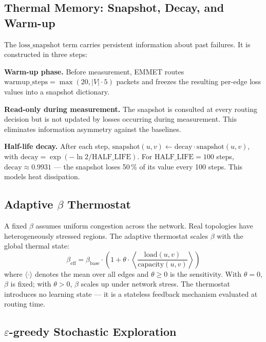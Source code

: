 \documentclass[11pt,a4paper]{article}
\begin{document}
\subsection{Thermal Memory: Snapshot, Decay, and Warm-up}

The $\mathrm{loss\_snapshot}$ term carries persistent information
about past failures. It is constructed in three steps:

\textbf{Warm-up phase.} Before measurement, EMMET routes
$\mathrm{warmup\_steps} = \max(20, |V| \cdot 5)$ packets and freezes
the resulting per-edge loss values into a snapshot dictionary.

\textbf{Read-only during measurement.} The snapshot is consulted at
every routing decision but is not updated by losses occurring during
measurement. This eliminates information asymmetry against the
baselines.

\textbf{Half-life decay.} After each step,
$\mathrm{snapshot}(u,v) \leftarrow \mathrm{decay} \cdot
\mathrm{snapshot}(u,v)$, with
$\mathrm{decay} = \exp(-\ln 2 / \mathrm{HALF\_LIFE})$. For
$\mathrm{HALF\_LIFE} = 100$ steps, $\mathrm{decay} \approx 0.9931$ ---
the snapshot loses 50\,\% of its value every 100 steps. This models
heat dissipation.

\subsection{Adaptive \texorpdfstring{$\beta$}{beta} Thermostat}
\label{sec:thermostat}

A fixed $\beta$ assumes uniform congestion across the network. Real
topologies have heterogeneously stressed regions. The adaptive
thermostat scales $\beta$ with the global thermal state:
\begin{equation}
\beta_{\mathrm{eff}} = \beta_{\mathrm{base}} \cdot
  \left(1 + \theta \cdot
  \left\langle \frac{\mathrm{load}(u,v)}{\mathrm{capacity}(u,v)}
  \right\rangle \right)
\end{equation}
where $\langle \cdot \rangle$ denotes the mean over all edges and
$\theta \geq 0$ is the sensitivity. With $\theta = 0$, $\beta$ is
fixed; with $\theta > 0$, $\beta$ scales up under network stress. The
thermostat introduces no learning state --- it is a stateless
feedback mechanism evaluated at routing time.

\subsection{\texorpdfstring{$\varepsilon$}{Epsilon}-greedy Stochastic Exploration}
\label{sec:eps}
\end{document}
